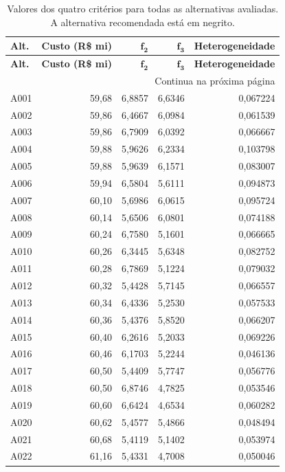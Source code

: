 \begin{longtable}{lrrrr}
\caption{Valores dos quatro critérios para todas as alternativas avaliadas. A alternativa recomendada está em negrito.}\label{tab:todas_alternativas}\\
\toprule
\textbf{Alt.} & \textbf{Custo (R\$ mi)} & $\boldsymbol{f_2}$ & $\boldsymbol{f_3}$ & \textbf{Heterogeneidade} \\
\midrule
\endfirsthead
\toprule
\textbf{Alt.} & \textbf{Custo (R\$ mi)} & $\boldsymbol{f_2}$ & $\boldsymbol{f_3}$ & \textbf{Heterogeneidade} \\
\midrule
\endhead
\midrule
\multicolumn{5}{r}{Continua na próxima página}\\
\endfoot
\bottomrule
\endlastfoot
A001 & 59,68 & 6,8857 & 6,6346 & 0,067224 \\
A002 & 59,86 & 6,4667 & 6,0984 & 0,061539 \\
A003 & 59,86 & 6,7909 & 6,0392 & 0,066667 \\
A004 & 59,88 & 5,9626 & 6,2334 & 0,103798 \\
A005 & 59,88 & 5,9639 & 6,1571 & 0,083007 \\
A006 & 59,94 & 6,5804 & 5,6111 & 0,094873 \\
A007 & 60,10 & 5,6986 & 6,0615 & 0,095724 \\
A008 & 60,14 & 5,6506 & 6,0801 & 0,074188 \\
A009 & 60,24 & 6,7580 & 5,1601 & 0,066665 \\
A010 & 60,26 & 6,3445 & 5,6348 & 0,082752 \\
A011 & 60,28 & 6,7869 & 5,1224 & 0,079032 \\
A012 & 60,32 & 5,4428 & 5,7145 & 0,066557 \\
A013 & 60,34 & 6,4336 & 5,2530 & 0,057533 \\
A014 & 60,36 & 5,4376 & 5,8520 & 0,066207 \\
A015 & 60,40 & 6,2616 & 5,2033 & 0,069226 \\
A016 & 60,46 & 6,1703 & 5,2244 & 0,046136 \\
A017 & 60,50 & 5,4409 & 5,7747 & 0,056776 \\
A018 & 60,50 & 6,8746 & 4,7825 & 0,053546 \\
A019 & 60,60 & 6,6424 & 4,6534 & 0,060282 \\
A020 & 60,62 & 5,4577 & 5,4866 & 0,048494 \\
A021 & 60,68 & 5,4119 & 5,1402 & 0,053974 \\
A022 & 61,16 & 5,4331 & 4,7008 & 0,050046 \\

\end{longtable}
